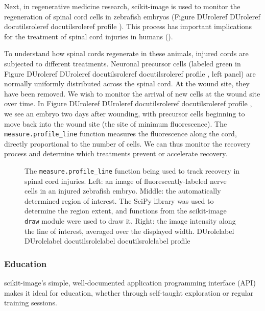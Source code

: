 \documentclass[letterpaper,compsoc,twoside]{IEEEtran}
\providecommand*{\DUrole}[2]{%
  \ifcsname DUrole#1\endcsname%
    \csname DUrole#1\endcsname{#2}%
  \else%
    \ifcsname docutilsrole#1\endcsname%
      \csname docutilsrole#1\endcsname{#2}%
    \else%
      #2%
    \fi%
  \fi%
}
\begin{document}
Next, in regenerative medicine research, scikit-image is used to monitor the
regeneration of spinal cord cells in zebrafish embryos (Figure \DUrole{ref}{profile}).
This process has important implications for the treatment of spinal cord
injuries in humans (\cite{Bhatt04,Thuret06}).

To understand how spinal cords regenerate in these animals, injured cords are
subjected to different treatments. Neuronal precursor cells (labeled green in Figure \DUrole{ref}{profile}, left panel) are
normally uniformly distributed across the spinal cord. At the wound site, they
have been removed. We wish to monitor the arrival of new cells at the
wound site over time. In Figure \DUrole{ref}{profile}, we see an embryo two days after
wounding, with precursor cells beginning to move back into the wound site (the site of
minimum fluorescence). The \texttt{measure.profile\_line} function measures the
fluorescence along the cord, directly proportional to the number of cells. We
can thus monitor the recovery process and determine which treatments prevent or
accelerate recovery.\begin{figure}[bht]\noindent{}
\caption{The \texttt{measure.profile\_line} function being used to track recovery in spinal
cord injuries. Left: an image of fluorescently-labeled nerve cells in an
injured zebrafish embryo. Middle: the automatically determined region of
interest. The SciPy library was used to determine the region extent, and
functions from the scikit-image \texttt{draw} module were used to draw it. Right:
the image intensity along the line of interest, averaged over the displayed
width.
\DUrole{label}{profile}}
\end{figure}

\subsubsection{Education%
  \label{education}%
}


scikit-image's simple, well-documented application programming interface (API)
makes it ideal for education, whether through self-taught exploration or
regular training sessions.
\end{document}
